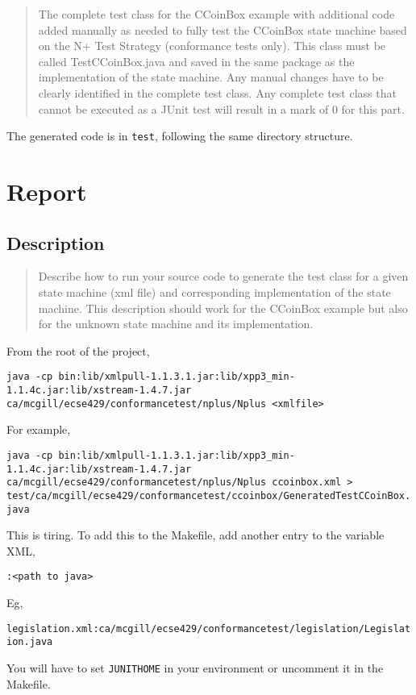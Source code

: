 \documentclass[ieee]{submit}
\begin{document}
\begin{quote}
The complete test class for the CCoinBox example with additional code added manually as
needed to fully test the CCoinBox state machine based on the N+ Test Strategy (conformance tests only). This class must be called TestCCoinBox.java and saved in the same package as the implementation of the state machine. Any manual changes have to be clearly identified in the
complete test class. Any complete test class that cannot be executed as a JUnit test will result in a mark of 0 for this part.
\end{quote}

The generated code is in {\tt test}, following the same directory structure.

\section{Report}

\subsection{Description}

\begin{quote}
Describe how to run your source code to generate the test class for a given state machine (xml file) and corresponding implementation of the state machine. This description should work for the CCoinBox example but also for the unknown state machine and its implementation.
\end{quote}

From the root of the project,

{\tt java -cp bin:lib/xmlpull-1.1.3.1.jar:lib/xpp3\_min-1.1.4c.jar:lib/xstream-1.4.7.jar ca/mcgill/ecse429/conformancetest/nplus/Nplus <xmlfile>}

For example,

{\tt java -cp bin:lib/xmlpull-1.1.3.1.jar:lib/xpp3\_min-1.1.4c.jar:lib/xstream-1.4.7.jar ca/mcgill/ecse429/conformancetest/nplus/Nplus ccoinbox.xml > test/ca/mcgill/ecse429/conformancetest/ccoinbox/GeneratedTestCCoinBox.java}

This is tiring. To add this to the Makefile, add another entry to the variable XML,

{\tt <xml file>:<path to java>}

Eg,

{\tt legislation.xml:ca/mcgill/ecse429/conformancetest/legislation/Legislation.java}

You will have to set {\tt JUNITHOME} in your environment or uncomment it in the Makefile.
\end{document}
